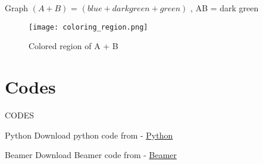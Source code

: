 \documentclass{beamer}
\providecommand{\brak}[1]{\ensuremath{\left(#1\right)}}
\begin{document}
\begin{frame}{Graph}
 \brak{A + B} = \brak{blue + dark green + green} , AB =  dark green 
   \begin{figure}[!ht]
		\centering
		\texttt{[image: coloring\_region.png]}
		\caption{Colored region of  A + B }
		\label{fig-1}
	\end{figure} 
\end{frame}


\section{Codes}
\begin{frame}{CODES}
    \begin{block}{Python}
         Download python code from - \href{https://github.com/Donal-08/Assignment-7/blob/main/code/line.py}{Python}
    \end{block}

 \begin{block}{Beamer}
         Download Beamer code from - \href{}{Beamer}
    \end{block}
\end{frame} 
\end{document}
